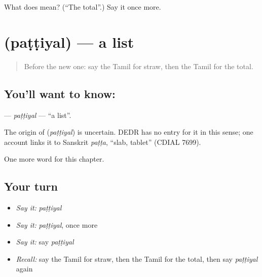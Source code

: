 \begin{tcolorbox}[breakable,colback=teal!4,colframe=teal!35!black,title={Before you move on}]
What does  mean? (\textquotedblleft{}The total\textquotedblright{}.) Say it once more.
\end{tcolorbox}
\section[\texorpdfstring{\ta{பட்டியல்} (paṭṭiyal)}{பட்டியல் (paṭṭiyal)}]{ (paṭṭiyal) — a list}

\label{lesson:TA-C251-pattiyal}



\begin{quote}
Before the new one: say the Tamil for straw, then the Tamil for the total.
\end{quote}

\subsection*{You'll want to know: }
\textbf{} — \emph{paṭṭiyal} — \textquotedblleft{}a list\textquotedblright{}.

\begin{cousinweb}
The origin of \textbf{} (\emph{paṭṭiyal}) is uncertain. DEDR has no entry for it in this sense; one account links it to Sanskrit \emph{paṭṭa}, \textquotedblleft{}slab, tablet\textquotedblright{} (CDIAL 7699).
\end{cousinweb}

\begin{grammarlens}[title={What you've built}]
One more word for this chapter.
\end{grammarlens}

\subsection*{Your turn}
\begin{itemize}
\raggedright
  \item \emph{Say it:} \emph{paṭṭiyal}
  \item \emph{Say it:} \emph{paṭṭiyal}, once more
  \item \emph{Say it:} say \emph{paṭṭiyal}
  \item \emph{Recall:} say the Tamil for straw, then the Tamil for the total, then say \emph{paṭṭiyal} again
\end{itemize}

